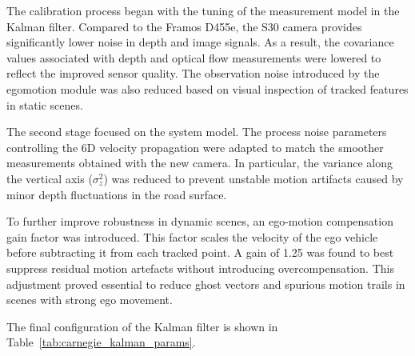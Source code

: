 The calibration process began with the tuning of the measurement 
model in the Kalman filter. Compared to the Framos D455e, the S30 
camera provides significantly lower noise in depth and image signals. 
As a result, the covariance values associated with depth and optical 
flow measurements were lowered to reflect the improved sensor 
quality. The observation noise introduced by the egomotion module 
was also reduced based on visual inspection of tracked features in 
static scenes.

The second stage focused on the system model. The process noise 
parameters controlling the 6D velocity propagation were adapted to 
match the smoother measurements obtained with the new camera. 
In particular, the variance along the vertical axis ($\sigma^2_z$) was 
reduced to prevent unstable motion artifacts caused by minor 
depth fluctuations in the road surface.

To further improve robustness in dynamic scenes, an ego-motion 
compensation gain factor was introduced. This factor scales the 
velocity of the ego vehicle before subtracting it from each tracked 
point. A gain of 1.25 was found to best suppress residual motion 
artefacts without introducing overcompensation. This adjustment 
proved essential to reduce ghost vectors and spurious motion 
trails in scenes with strong ego movement.

The final configuration of the Kalman filter is shown in 
Table~\ref{tab:carnegie_kalman_params}.

